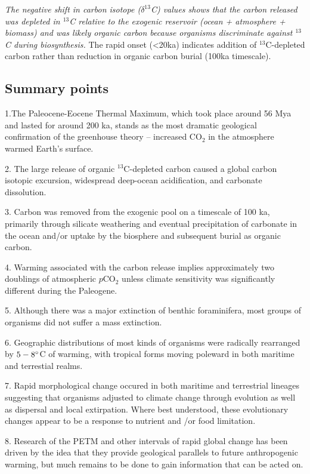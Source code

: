 \textit{The negative shift in carbon
isotope ($\delta^{13}$C) values shows that the carbon released was depleted in
$^{13}$C relative to the exogenic reservoir (ocean + atmosphere + biomass) and
was likely organic carbon because organisms discriminate against
$^{13}$C during biosynthesis.} The rapid onset (<20ka) indicates addition of
$^{13}$C-depleted carbon rather than reduction in organic carbon burial (100ka
timescale).

\subsection{Summary points}

1.The Paleocene-Eocene Thermal Maximum, which took place around 56 Mya and
lasted for around 200 ka, stands as the most dramatic geological confirmation
of the greenhouse theory -- increased CO$_2$ in the atmosphere warmed Earth's
surface.

2. The large release of organic $^{13}$C-depleted carbon caused a global
carbon isotopic excursion, widespread deep-ocean acidification, and carbonate
dissolution.

3. Carbon was removed from the exogenic pool on a timescale of 100 ka,
primarily through silicate weathering and eventual precipitation of carbonate
in the ocean and/or uptake by the biosphere and subsequent burial as organic
carbon.

4. Warming associated with the carbon release implies approximately two
doublings of atmospheric $p$CO$_2$ unless climate sensitivity was significantly
different during the Paleogene.

5. Although there was a major extinction of benthic foraminifera, most groups
of organisms did not suffer a mass extinction.

6. Geographic distributions of most kinds of organisms were radically
rearranged by $5-8 \degree$C of warming, with tropical forms moving poleward
in both maritime and terrestial realms.

7. Rapid morphological change occured in both maritime and terrestrial lineages
suggesting that organisms adjusted to climate change through evolution as well
as dispersal and local extirpation. Where best understood, these evolutionary
changes appear to be a response to nutrient and /or food limitation.

8. Research of the PETM and other intervals of rapid global change has been
driven by the idea that they provide geological parallels to future
anthropogenic warming, but much remains to be done to gain information that can
be acted on.

